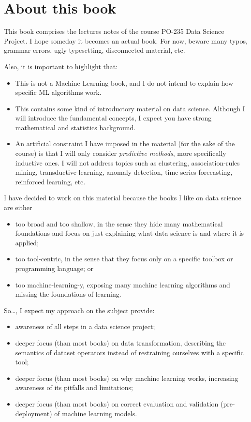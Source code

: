 \chapter*{About this book}

This book comprises the lectures notes of the course PO-235 Data Science Project.
I hope someday it becomes an actual book. For now, beware many typos, grammar errors, ugly
typesetting, disconnected material, etc.

Also, it is important to highlight that:
\begin{itemize}
  \item This is not a Machine Learning book, and I do not intend to explain how specific
    ML algorithms work.
  \item This contains some kind of introductory material on data science.  Although I will
    introduce the fundamental concepts, I expect you have strong mathematical and
    statistics background.
  \item An artificial constraint I have imposed in the material (for the sake of the
    course) is that I will only consider \emph{predictive methods}, more specifically
    inductive ones. I will not address topics such as clustering, association-rules
    mining, transductive learning, anomaly detection, time series forecasting, reinforced
    learning, etc.
\end{itemize}

I have decided to work on this material because the books I like on data science are
either
\begin{itemize}
  \item too broad and too shallow, in the sense they hide many mathematical foundations
    and focus on just explaining what data science is and where it is applied;
  \item too tool-centric, in the sense that they focus only on a specific toolbox or
    programming language; or
  \item too machine-learning-y, exposing many machine learning algorithms and missing the
    foundations of learning.
\end{itemize}

So\dots, I expect my approach on the subject provide:
\begin{itemize}
  \item awareness of all steps in a data science project;
  \item deeper focus (than most books) on data transformation, describing the semantics of dataset
    operators instead of restraining ourselves with a specific tool;
  \item deeper focus (than most books) on why machine learning works, increasing awareness of its pitfalls and
    limitations;
  \item deeper focus (than most books) on correct evaluation and validation
    (pre-deployment) of machine learning models.
\end{itemize}

